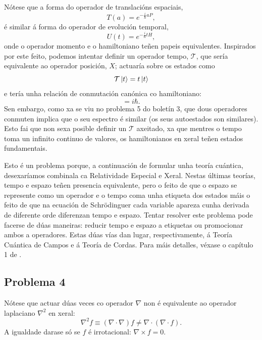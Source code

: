 \documentclass[a4paper,12pt]{article}
\begin{document}
Nótese que a forma do operador de translacións espaciais,
\begin{equation}
	T(a) = e^{-\frac{i}{\hbar}a P},
\end{equation}
\noindent
é similar á forma do operador de evolución temporal,
\begin{equation}
	U(t) = e^{-\frac{i}{\hbar}t H},
\end{equation}
\noindent
onde o operador momento e o hamiltoniano teñen papeis equivalentes. Inspirados por este feito, podemos intentar definir un operador tempo, $\mathcal{T}$, que sería equivalente ao operador posición, $X$; actuaría sobre os estados como
\begin{equation}
	\mathcal{T}\ket{t} = t \ket{t}
\end{equation}
 e tería unha relación de conmutación canónica co hamiltoniano:
\begin{equation}
	[\mathcal{T},H] = i\hbar.
\end{equation}
\noindent
Sen embargo, como xa se viu no problema 5 do boletín 3, que dous operadores conmuten implica que o seu espectro é similar (os seus autoestados son similares). Esto fai que non sexa posible definir un $\mathcal{T}$ axeitado, xa que mentres o tempo toma un infinito continuo de valores, os hamiltonianos en xeral teñen estados fundamentais.

Esto é un problema porque, a continuación de formular unha teoría cuántica, desexaríamos combinala ca Relatividade Especial e Xeral. Nestas últimas teorías, tempo e espazo teñen presencia equivalente, pero o feito de que o espazo se represente como un operador e o tempo coma unha etiqueta dos estados máis o feito de que na ecuación de Schrödinguer cada variable apareza cunha derivada de diferente orde diferenzan tempo e espazo.
Tentar resolver este problema pode facerse de dúas maneiras: reducir tempo e espazo a etiquetas ou promocionar ambos a operadores. Estas dúas vías dan lugar, respectivamente, á Teoría Cuántica de Campos e á Teoría de Cordas. Para máis detalles, véxase o capítulo 1 de \cite{Srednicki}.

\subsection*{Problema 4}

Nótese que actuar dúas veces co operador $\nabla$ non é equivalente ao operador laplaciano $\nabla^2$ en xeral:
\begin{equation}
	\nabla^2 f \equiv (\nabla \cdot \nabla) f \neq \nabla \cdot (\nabla \cdot f).
\end{equation}
\noindent
A igualdade darase só se $f$ é irrotacional: $\nabla \times f = 0$.
\end{document}
